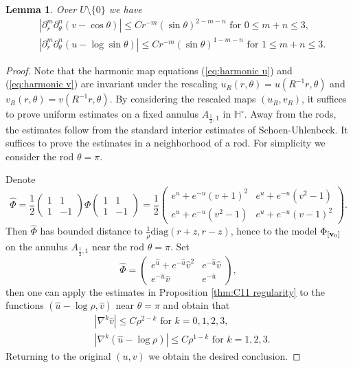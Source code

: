 \documentclass[a4paper,11pt]{amsart}
\newtheorem{lemma}[theorem]{Lemma}
\theoremstyle{definition}
\numberwithin{equation}{section}
\newcommand{\dH}{\mathbb{H}}
\DeclareMathOperator{\bv}{{\bf v}}
\begin{document}
 
\begin{lemma}\label{lem:rescaled estimate}
	Over $U\setminus\{0\}$ we have
	\begin{align}
		&|\partial_r^m\partial_{\theta}^n(v-\cos\theta)|\leq Cr^{-m}(\sin\theta)^{2-m-n}\text{ for $0\leq m+n\leq3$}, \label{eq:puncture harmonic estimate v}\\
		&|\partial_r^m\partial_{\theta}^n(u-\log\sin\theta)|\leq Cr^{-m}(\sin\theta)^{1-m-n}\text{ for $1\leq m+n\leq3$}. \label{eq:puncture harmonic estimate u}
	\end{align}
\end{lemma}
\begin{proof}

 Note that the harmonic map equations (\ref{eq:harmonic u}) and (\ref{eq:harmonic v}) are invariant under the rescaling $u_{R}(r,\theta)=u(R^{-1}r,\theta)$ and $v_{R}(r,\theta)=v(R^{-1}r,\theta)$. 
 By considering the rescaled maps $(u_R, v_R)$, it suffices to prove uniform estimates on a fixed annulus $A_{{\frac{1}{2}},1}$ in $\dH^\circ$. Away from the rods, the estimates follow from the standard interior estimates of Schoen-Uhlenbeck. It suffices to prove the estimates in a neighborhood of a rod. For simplicity we consider the rod $\theta=\pi$.
 
	Denote 
	$$\widehat\Phi=\frac12\left(\begin{matrix}
		1 &1\\ 1& -1\end{matrix}\right)\Phi\left(\begin{matrix}
			1 &1\\ 1& -1\end{matrix}\right)=\frac12\left(\begin{matrix}
				e^{u}+e^{-u}(v+1)^2&e^{u}+e^{-u}(v^2-1)\\
				e^{u}+e^{-u}(v^2-1)&e^{u}+e^{-u}(v-1)^2
				\end{matrix}\right).$$
				Then $\widehat \Phi$ has bounded distance to $\frac{1}{\rho}\mathrm{diag}(r+z,r-z)$, hence to the  model $\Phi_{[\bv_0]}$ on the annulus $ A_{{\frac{1}{2}},1}$ near the rod $\theta=\pi$. Set 
	$$\widehat\Phi=\left(\begin{matrix}
		e^{\widehat u}+e^{-\widehat u}{\widehat v}^2 & e^{-\widehat u} \widehat v\\e^{-\widehat u}\widehat v & e^{-\widehat u}
	\end{matrix}\right),$$
	then one can apply the estimates in Proposition \eqref{thm:C11 regularity} to the functions $(\widehat u-\log\rho,\widehat v)$ near $\theta=\pi$ and obtain that
	\begin{align*}
		&|\nabla^k\widehat v|\leq C\rho^{2-k}\text{ for $k=0,1,2,3$},\\
        &|\nabla^k(\widehat u-\log\rho)|\leq C\rho^{1-k}\text{ for $k=1,2,3$}.
	\end{align*}
Returning to the original $(u, v)$ we obtain the desired conclusion.\end{proof}
\end{document}
